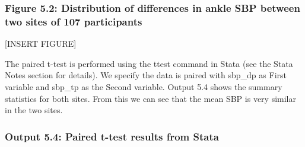 \documentclass[
]{memoir}
\begin{document}
\hypertarget{figure-5.2-distribution-of-differences-in-ankle-sbp-between-two-sites-of-107-participants}{%
\subsubsection{Figure 5.2: Distribution of differences in ankle SBP between two sites of 107 participants}\label{figure-5.2-distribution-of-differences-in-ankle-sbp-between-two-sites-of-107-participants}}

{[}INSERT FIGURE{]}

The paired t-test is performed using the ttest command in Stata (see the Stata Notes section for details). We specify the data is paired with sbp\_dp as First variable and sbp\_tp as the Second variable. Output 5.4 shows the summary statistics for both sites. From this we can see that the mean SBP is very similar in the two sites.

\hypertarget{output-5.4-paired-t-test-results-from-stata}{%
\subsubsection{Output 5.4: Paired t-test results from Stata}\label{output-5.4-paired-t-test-results-from-stata}}
\end{document}
